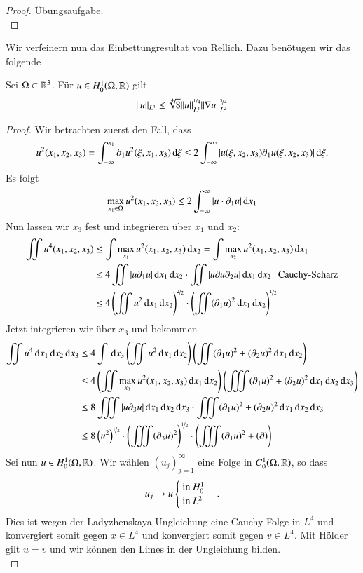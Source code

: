     \begin{proof}
    Übungsaufgabe. \[ \]
    \end{proof}

    Wir verfeinern nun das Einbettungresultat von Rellich. Dazu benötugen wir das folgende

    \begin{lem}[Ladyzhenshaya]
    Sei $\Omega\subset\mathbb{R}^3$. Für $u\in H_0^1(\Omega,\mathbb{R})$ gilt
    \[
    \|u\|_{L^4}\leq \sqrt[4]{8} \|u\|_{L^4}^{\nicefrac14}\|\nabla u \|_{L^2}^{\nicefrac34}
    \]    
    \end{lem}

    \begin{proof}
    Wir betrachten zuerst den Fall, dass
    \[
    u^2(x_1,x_2,x_3)=\int_{-\infty}^{x_1} \partial_1 u^2(\xi,x_1,x_3)\, \mathrm{d} \xi\leq 2\int_{-\infty}
    ^{\infty}|u(\xi,x_2,x_3)\partial_1u(\xi,x_2,x_3)|\, \mathrm{d}\xi.
    \]
    Es folgt
    \[
    \max_{x_1\in\Omega}u^2(x_1,x_2,x_3)\leq2\int_{-\infty}^\infty|u\cdot\partial_1u| \, \mathrm{d} x_1
    \]
    Nun lassen wir $x_3$ fest und integrieren über $x_1$ und $x_2$:
    \begin{align*}
    \iint u^4(x_1,x_2,x_3) &\leq \int \max_{x_1} u^2(x_1,x_2,x_3) \, \mathrm{d} x_2 = \int\max_{x_2}
    u^2(x_1,x_2,x_3)\, \mathrm{d} x_1\\
        &\leq 4 \iint |u\partial_1 u|  \, \mathrm{d} x_1 \, \mathrm{d} x_2 \cdot \iint|u\partial u \partial _2 u| 
        \, \mathrm{d} x_1 \, \mathrm{d} x_2 \hspace{.25cm} \text{Cauchy-Scharz}\\
            &\leq 4\left( \iint u^2 \, \mathrm{d} x_1 \, \mathrm{d} x_2\right)^{\nicefrac22}\cdot\left(\iint(\partial_1u)^2
                    \, \mathrm{d} x_1\, \mathrm{d} x_2\right)^{\nicefrac 12}
            \end{align*}
            Jetzt integrieren wir über $x_3$ und bekommen
            \begin{align*}
\iint u^4\, \mathrm{d} x_1\, \mathrm{d} x_2 \, \mathrm{d} x_3 &\leq 4 \int \, \mathrm{d} x_3 \left(\iint u ^2 \, \mathrm{d} x_1 \, \mathrm{d} x_2\right) 
    \left( \iint(\partial_1u)^2 + (\partial_2 u)^2 \, \mathrm{d} x_1 \, \mathrm{d} x_2 \right)\\
        &\leq 4\left( \iint\max_{x_3} u^2(x_1,x_2,x_3) \, \mathrm{d} x_1 \, \mathrm{d} x_2 \right)\left( \iiint 
                (\partial_1 u )^2 + (\partial _2 u)^2 \, \mathrm{d} x_1 \, \mathrm{d} x_2 \, \mathrm{d} x_3\right)\\
            &\leq 8 \iiint | u \partial_3 u | \, \mathrm{d} x_1 \, \mathrm{d} x_2 \, \mathrm{d} x_3 \cdot \iiint (\partial_1 u )^2 +
            (\partial _2 u)^2 \, \mathrm{d} x_1 \, \mathrm{d} x_2 \, \mathrm{d} x_3\\
                &\leq 8\left( u^2 \right)^{\nicefrac12}\cdot\left( \iiint(\partial_3u)^2 \right)^{\nicefrac12}
\cdot \left(\iiint (\partial_1 u)^2 + (\partial)\right)
    \end{align*}
    Sei nun  $u\in H_0^1(\Omega,\mathbb{R})$. Wir wählen $(u_j)_{j=1}^\infty$ eine Folge in $C_0^1(\Omega,\mathbb{R})$,
    so dass
    \[
    u_j\rightarrow u \begin{cases} \text{ in } H_0^1\\ \text{ in } L^2  \end{cases}.
    \]
    Dies ist wegen der Ladyzhenskaya-Ungleichung eine Cauchy-Folge in $L^4$ und konvergiert somit gegen
    $x\in L^4$ und konvergiert somit gegen $v\in L^4$. Mit Hölder gilt $u=v$ und wir können den Limes
    in der Ungleichung bilden.\[ \]
    \end{proof}

